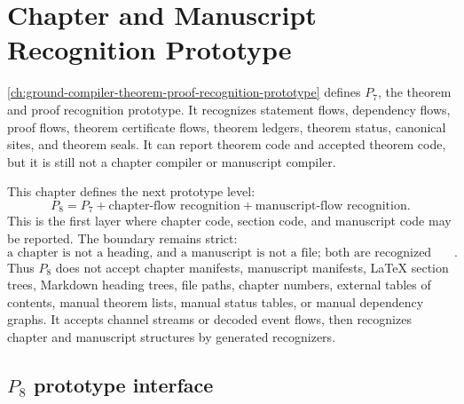 \chapter{Chapter and Manuscript Recognition Prototype}
\label{ch:ground-compiler-chapter-manuscript-recognition-prototype}

\autoref{ch:ground-compiler-theorem-proof-recognition-prototype} defines $P_7$, the theorem and proof recognition prototype. It recognizes statement flows, dependency flows, proof flows, theorem certificate flows, theorem ledgers, theorem status, canonical sites, and theorem seals. It can report theorem code and accepted theorem code, but it is still not a chapter compiler or manuscript compiler.

This chapter defines the next prototype level:
$$
  \boxed{P_8=P_7+\text{chapter-flow recognition}+\text{manuscript-flow recognition}.}
$$
This is the first layer where chapter code, section code, and manuscript code may be reported. The boundary remains strict:
$$
  \boxed{\text{a chapter is not a heading, and a manuscript is not a file; both are recognized event-flow structures}.}
$$
Thus $P_8$ does not accept chapter manifests, manuscript manifests, LaTeX section trees, Markdown heading trees, file paths, chapter numbers, external tables of contents, manual theorem lists, manual status tables, or manual dependency graphs. It accepts channel streams or decoded event flows, then recognizes chapter and manuscript structures by generated recognizers.

\section{$P_8$ prototype interface}
\label{sec:chapter-manuscript-p8-interface}

